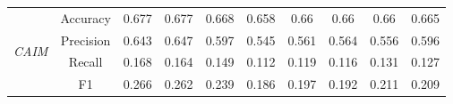 \begin{table}[H]
\begin{tabular}{|c|c|c|c|c|c|c|c|c|c|}
        \multirow{4}{*}{\textit{CAIM}}  & Accuracy & 0.677 & 0.677 & 0.668 & 0.658 & 0.66 & 0.66 & 0.66 & 0.665 \\ \cline{2-10}
                                         & Precision & 0.643 & 0.647 & 0.597 & 0.545 & 0.561 & 0.564 & 0.556 & 0.596 \\ \cline{2-10}
                                         & Recall & 0.168 & 0.164 & 0.149 & 0.112 & 0.119 & 0.116 & 0.131 & 0.127 \\ \cline{2-10}
                                         & F1 & 0.266 & 0.262 & 0.239 & 0.186 & 0.197 & 0.192 & 0.211 & 0.209 \\ \hline \hline

            \hline
    \end{tabular}
\end{table}

